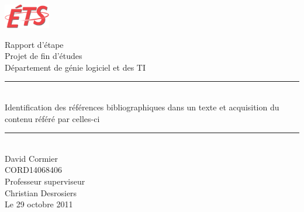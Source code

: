 \begin{titlepage}

\includegraphics[width=2cm]{./ets}
\begin{center}
\Large Rapport d'étape \\[1cm]
\Large Projet de fin d'études \\[0.5cm]
\Large Département de génie logiciel et des TI\\[1.0cm]
\hrule \\[0.2cm] 
\LARGE Identification des références bibliographiques dans un texte et acquisition du contenu référé par celles-ci\\[0.2cm]
\hrule \\[4cm]
David Cormier\\
CORD14068406\\[2cm]
Professeur superviseur\\
Christian Desrosiers\\[2cm]
Le 29 octobre 2011
\end{center}
\end{titlepage}

